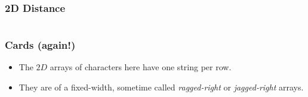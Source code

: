
\begin{frame}[fragile]
\frametitle{2D Distance}

\begin{columns}
\begin{column}{0.60\textwidth}

\end{column}

\pause
\begin{column}{0.30\textwidth}
\end{column}

\end{columns}
\end{frame}



\begin{frame}[fragile]
\frametitle{Cards (again!)}



\pause
\begin{itemize}[<+->]
\item The $2D$ arrays of characters here have one string per row.
\item They are of a fixed-width, sometime called {\em ragged-right} or {\em jagged-right} arrays.
\end{itemize}

\end{frame}


